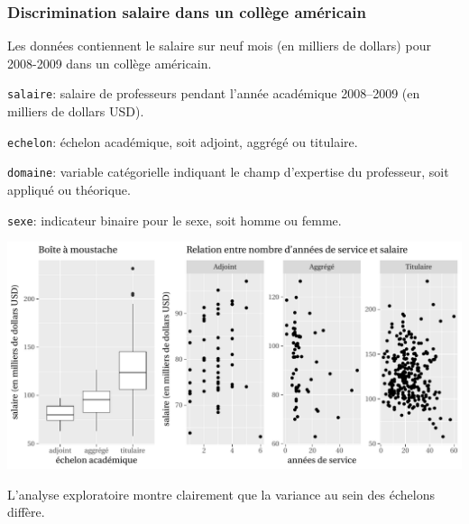 \documentclass{beamer}
\begin{document}
\begin{frame}
\frametitle{Discrimination salaire dans un collège américain}
Les données  contiennent le salaire sur neuf mois (en milliers de dollars) pour 2008-2009 dans un collège américain.
\bi
\item \texttt{salaire}: salaire de professeurs pendant l’année académique 2008–2009 (en milliers de dollars
USD).
\item \texttt{echelon}: échelon académique, soit adjoint, aggrégé ou titulaire.
\item \texttt{domaine}: variable catégorielle indiquant le champ d’expertise du professeur, soit appliqué ou théorique.
\item \texttt{sexe}: indicateur binaire pour le sexe, soit homme ou femme.
\ei
\end{frame}
\begin{frame}
 \begin{center}
\includegraphics[width = 0.95\linewidth]{img/c5/06-correlated-salary_EDA_fr}  
 \end{center}
L'analyse exploratoire montre clairement que la variance au sein des échelons diffère.
\end{frame}
\end{document}
